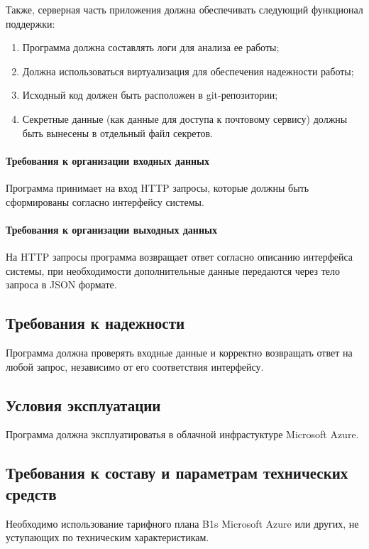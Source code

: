 \documentclass[techtask]{espd}
\begin{document}
Также, серверная часть приложения должна обеспечивать следующий функционал поддержки:

\begin{enumerate}
\item Программа должна составлять логи для анализа ее работы;
\item Должна использоваться виртуализация для обеспечения надежности работы;
\item Исходный код должен быть расположен в git-репозитории;
\item Секретные данные (как данные для доступа к почтовому сервису) должны быть вынесены в отдельный файл секретов.
\end{enumerate}

\paragraph{Требования к организации входных данных}
Программа принимает на вход HTTP запросы, которые должны быть сформированы согласно интерфейсу системы.

\paragraph{Требования к организации выходных данных}
На HTTP запросы программа возвращает ответ согласно описанию интерфейса системы, при необходимости дополнительные данные передаются через тело запроса в JSON формате.

\subsection{Требования к надежности}
Программа должна проверять входные данные и корректно возвращать ответ на любой запрос, независимо от его соответствия интерфейсу.

\subsection{Условия эксплуатации}
Программа должна эксплуатироватья в облачной инфрастуктуре Microsoft Azure.

\subsection{Требования к составу и параметрам технических средств}
Необходимо использование тарифного плана B1s Microsoft Azure или других, не уступающих по техническим характеристикам.
\end{document}
